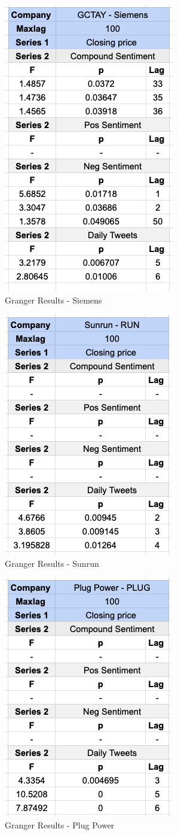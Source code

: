 \documentclass[sigconf, nonacm]{acmart}
\begin{document}
\begin{figure}[H]
  \centering
  \includegraphics[width=0.4\linewidth]{granger_results/granger_siemens.png}
  \caption{Granger Results - Siemens}
  \label{granger_siemens}
\end{figure}

\begin{figure}[H]
  \centering
  \includegraphics[width=0.4\linewidth]{granger_results/granger_sunrun.png}
  \caption{Granger Results - Sunrun}
  \label{granger_sunrun}
\end{figure}

\begin{figure}[H]
  \centering
  \includegraphics[width=0.4\linewidth]{granger_results/granger_plug.png}
  \caption{Granger Results - Plug Power}
  \label{granger_plug}
\end{figure}
\end{document}
